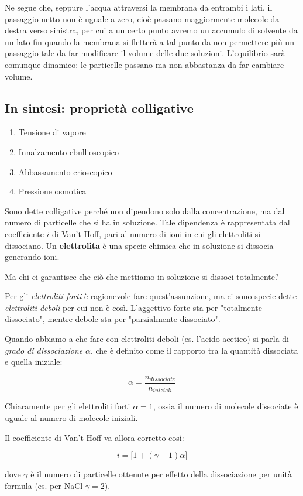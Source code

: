 Ne segue che, seppure l'acqua attraversi la membrana da entrambi i lati, il passaggio netto non è uguale a zero, cioè passano maggiormente molecole da destra verso sinistra, per cui a un certo punto avremo un accumulo di solvente da un lato fin quando la membrana si fletterà a tal punto da non permettere più un passaggio tale da far modificare il volume delle due soluzioni. L'equilibrio sarà comunque dinamico: le particelle passano ma non abbastanza da far cambiare volume.

\subsection{In sintesi: proprietà colligative}
\begin{enumerate}
    \item Tensione di vapore
    \item Innalzamento ebullioscopico
    \item Abbassamento crioscopico
    \item Pressione osmotica
\end{enumerate}
Sono dette colligative perché non dipendono solo dalla concentrazione, ma dal numero di particelle che si ha in soluzione. Tale dipendenza è rappresentata dal coefficiente $i$ di Van't Hoff, pari al numero di ioni in cui gli elettroliti si dissociano. Un \textbf{elettrolita} è una specie chimica che in soluzione si dissocia generando ioni.

Ma chi ci garantisce che ciò che mettiamo in soluzione si dissoci totalmente?

Per gli \textit{elettroliti forti} è ragionevole fare quest'assunzione, ma ci sono specie dette \textit{elettroliti deboli} per cui non è così. L'aggettivo forte sta per "totalmente dissociato", mentre debole sta per "parzialmente dissociato".

Quando abbiamo a che fare con elettroliti deboli (es. l'acido acetico) si parla di \textit{grado di dissociazione} $\alpha$, che è definito come il rapporto tra la quantità dissociata e quella iniziale:

$$\alpha=\frac{n_{dissociate}}{n_{iniziali}}$$

Chiaramente per gli elettroliti forti $\alpha=1$, ossia il numero di molecole dissociate è uguale al numero di molecole iniziali.

Il coefficiente di Van't Hoff va allora corretto così:

$$i=\big[1 + (\gamma - 1)\alpha \big]$$

dove $\gamma$ è il numero di particelle ottenute per effetto della dissociazione per unità formula (es. per NaCl $\gamma=2$).

